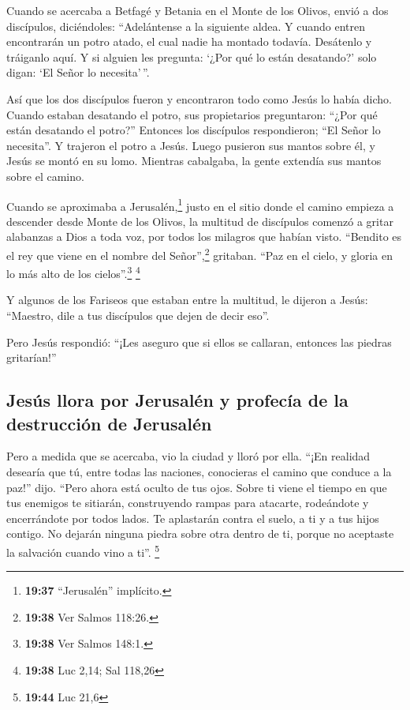  Cuando se acercaba a Betfagé y Betania en el Monte de
los Olivos, envió a dos discípulos, diciéndoles: 
``Adelántense a la siguiente aldea. Y cuando entren encontrarán un potro
atado, el cual nadie ha montado todavía. Desátenlo y tráiganlo aquí.
 Y si alguien les pregunta: `¿Por qué lo están
desatando?' solo digan: `El Señor lo necesita'\,''.

 Así que los dos discípulos fueron y encontraron todo
como Jesús lo había dicho.  Cuando estaban desatando el
potro, sus propietarios preguntaron: ``¿Por qué están desatando el
potro?''  Entonces los discípulos respondieron; ``El
Señor lo necesita''.  Y trajeron el potro a Jesús. Luego
pusieron sus mantos sobre él, y Jesús se montó en su lomo.
 Mientras cabalgaba, la gente extendía sus mantos sobre
el camino.

 Cuando se aproximaba a Jerusalén,\footnote{\textbf{19:37}
  ``Jerusalén'' implícito.} justo en el sitio donde el camino empieza a
descender desde Monte de los Olivos, la multitud de discípulos comenzó a
gritar alabanzas a Dios a toda voz, por todos los milagros que habían
visto.  ``Bendito es el rey que viene en el nombre del
Señor'',\footnote{\textbf{19:38} Ver Salmos 118:26.} gritaban. ``Paz en
el cielo, y gloria en lo más alto de los cielos''.\footnote{\textbf{19:38}
  Ver Salmos 148:1.} \footnote{\textbf{19:38} Luc 2,14; Sal 118,26}

 Y algunos de los Fariseos que estaban entre la multitud,
le dijeron a Jesús: ``Maestro, dile a tus discípulos que dejen de decir
eso''.

 Pero Jesús respondió: ``¡Les aseguro que si ellos se
callaran, entonces las piedras gritarían!''

\hypertarget{jesuxfas-llora-por-jerusaluxe9n-y-profecuxeda-de-la-destrucciuxf3n-de-jerusaluxe9n}{%
\subsection{Jesús llora por Jerusalén y profecía de la destrucción de
Jerusalén}\label{jesuxfas-llora-por-jerusaluxe9n-y-profecuxeda-de-la-destrucciuxf3n-de-jerusaluxe9n}}

 Pero a medida que se acercaba, vio la ciudad y lloró por
ella.  ``¡En realidad desearía que tú, entre todas las
naciones, conocieras el camino que conduce a la paz!'' dijo. ``Pero
ahora está oculto de tus ojos.  Sobre ti viene el tiempo
en que tus enemigos te sitiarán, construyendo rampas para atacarte,
rodeándote y encerrándote por todos lados.  Te aplastarán
contra el suelo, a ti y a tus hijos contigo. No dejarán ninguna piedra
sobre otra dentro de ti, porque no aceptaste la salvación cuando vino a
ti''. \footnote{\textbf{19:44} Luc 21,6}

